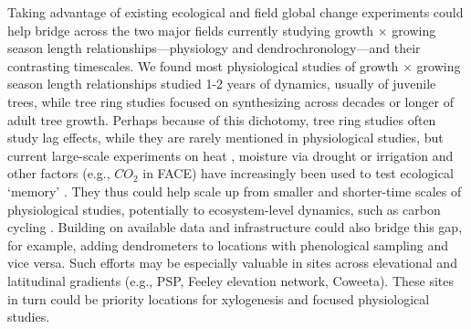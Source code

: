 \documentclass[11pt]{article}
\begin{document}
Taking advantage of existing ecological and field global change experiments could help bridge across the two major fields currently studying growth $\times$ growing season length relationships---physiology and dendrochronology---and their contrasting timescales. We found most physiological studies of growth $\times$ growing season length relationships studied 1-2 years of dynamics, usually of juvenile trees, while tree ring studies focused on synthesizing across decades or longer of adult tree growth. Perhaps because of this dichotomy, tree ring studies often study lag effects, while they are rarely mentioned in physiological studies, but current large-scale experiments on heat \citep[e.g., SPRUCE,][]{hanson2017attaining}, moisture via drought or irrigation \citep[e.g., DroughtNet, Phynwald][]{smith2016drought} and other factors (e.g., $CO_2$ in FACE) have increasingly been used to test ecological `memory' \citep[e.g., ][]{flinker2021promise, schweiger2022transgenerational}. They thus could help scale up from smaller and shorter-time scales of physiological studies, potentially to ecosystem-level dynamics, such as carbon cycling \citep{ding2021plant, jensen2019simulated}. Building on available data and infrastructure could also bridge this gap, for example, adding dendrometers to locations with phenological sampling and vice versa. Such efforts may be especially valuable in sites across elevational and latitudinal gradients (e.g., PSP, Feeley elevation network, Coweeta). These sites in turn could be priority locations for xylogenesis and focused physiological studies. 

\end{document}
